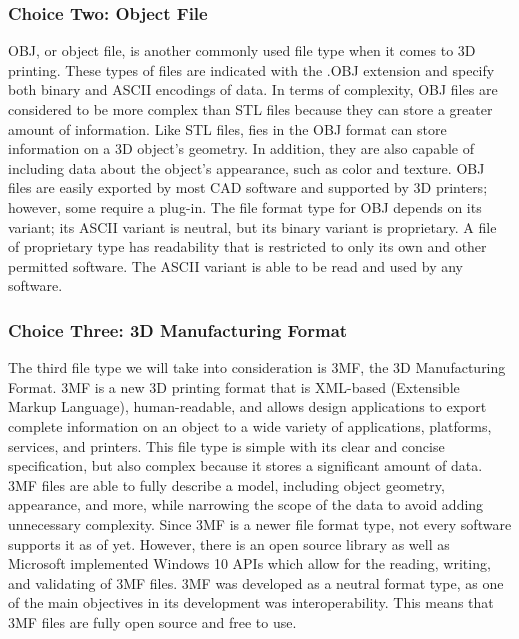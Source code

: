 \documentclass[letterpaper, onecolumn, draftclsnofoot,10pt, compsoc]{IEEEtran}
\begin{document}
\subsubsection{Choice Two: Object File}
OBJ, or object file, is another commonly used file type when it comes to 3D printing. 
These types of files are indicated with the .OBJ extension and specify both binary and ASCII encodings of data.
In terms of complexity, OBJ files are considered to be more complex than STL files because they can store a greater amount of information.
Like STL files, fies in the OBJ format can store information on a 3D object's geometry. 
In addition, they are also capable of including data about the object's appearance, such as color and texture. 
OBJ files are easily exported by most CAD software and supported by 3D printers; however, some require a plug-in. \cite{3dbeginweb}
The file format type for OBJ depends on its variant; its ASCII variant is neutral, but its binary variant is proprietary. 
A file of proprietary type has readability that is restricted to only its own and other permitted software. 
The ASCII variant is able to be read and used by any software.
\cite{all3dpweb}

\subsubsection{Choice Three: 3D Manufacturing Format}
The third file type we will take into consideration is 3MF, the 3D Manufacturing Format.
3MF is a new 3D printing format that is XML-based (Extensible Markup Language), human-readable, and allows design applications to export complete information on an object to a wide variety of applications, platforms, services, and printers. \cite{3mfweb}
This file type is simple with its clear and concise specification, but also complex because it stores a significant amount of data.
3MF files are able to fully describe a model, including object geometry, appearance, and more, while narrowing the scope of the data to avoid adding unnecessary complexity. 
Since 3MF is a newer file format type, not every software supports it as of yet.
However, there is an open source library as well as Microsoft implemented Windows 10 APIs which allow for the reading, writing, and validating of 3MF files. 
3MF was developed as a neutral format type, as one of the main objectives in its development was interoperability.
This means that 3MF files are fully open source and free to use. \cite{3mfweb}
\end{document}
